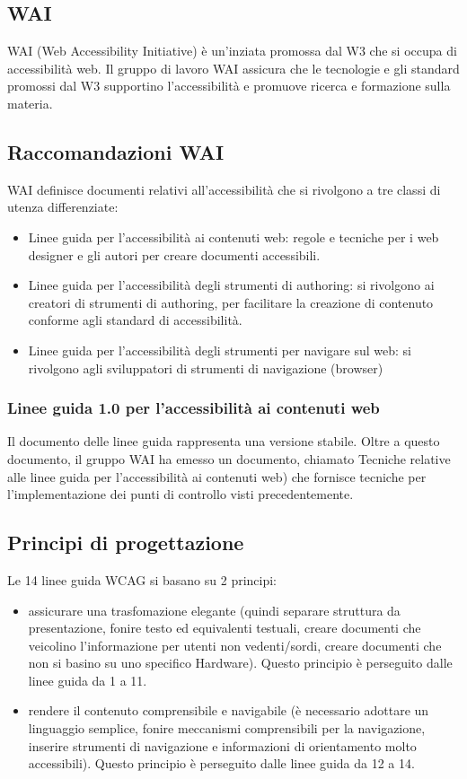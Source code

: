 \documentclass{article}
\begin{document}
\subsection{WAI}
WAI (Web Accessibility Initiative) è un'inziata promossa dal W3 che si occupa di accessibilità web. Il gruppo di lavoro WAI assicura che le tecnologie e gli standard promossi dal W3 supportino l'accessibilità e promuove ricerca e formazione sulla materia.
\subsection{Raccomandazioni WAI}
WAI definisce documenti relativi all'accessibilità che si rivolgono a tre classi di utenza differenziate:
\begin{itemize}
	\item Linee guida per l'accessibilità ai contenuti web: regole e tecniche per i web designer e gli autori per creare documenti accessibili.
	\item Linee guida per l'accessibilità degli strumenti di authoring: si rivolgono ai creatori di strumenti di authoring, per facilitare la creazione di contenuto conforme agli standard di accessibilità.
	\item Linee guida per l'accessibilità degli strumenti per navigare sul web: si rivolgono agli sviluppatori di strumenti di navigazione (browser)
\end{itemize}
\subsubsection{Linee guida 1.0 per l'accessibilità ai contenuti web}
Il documento delle linee guida rappresenta una versione stabile. Oltre a questo documento, il gruppo WAI ha emesso un documento, chiamato Tecniche relative alle linee guida per l'accessibilità ai contenuti web) che fornisce tecniche per l'implementazione dei punti di controllo visti precedentemente.
\subsection{Principi di progettazione}
Le 14 linee guida WCAG si basano su 2 principi: 
\begin{itemize}
	\item assicurare una trasfomazione elegante (quindi separare struttura da presentazione, fonire testo ed equivalenti testuali, creare documenti che veicolino l'informazione per utenti non vedenti/sordi, creare documenti che non si basino su uno specifico Hardware). Questo principio è perseguito dalle linee guida da 1 a 11.
	\item rendere il contenuto comprensibile e navigabile (è necessario adottare un linguaggio semplice, fonire meccanismi comprensibili per la navigazione, inserire strumenti di navigazione e informazioni di orientamento molto accessibili).
	Questo principio è perseguito dalle linee guida da 12 a 14.
\end{itemize}
\end{document}
